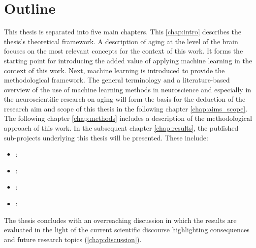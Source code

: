 \section{Outline}
This thesis is separated into five main chapters. This \autoref{chap:intro} describes the thesis's theoretical framework. A description of aging at the level of the brain focuses on the most relevant concepts for the context of this work. It forms the starting point for introducing the added value of applying machine learning in the context of this work. Next, machine learning is introduced to provide the methodological framework. The general terminology and a literature-based overview of the use of machine learning methods in neuroscience and especially in the neuroscientific research on aging will form the basis for the deduction of the research aim and scope of this thesis in the following chapter \autoref{chap:aims_scope}. The following chapter \autoref{chap:methods} includes a description of the methodological approach of this work. In the subsequent chapter \autoref{chap:results}, the published sub-projects underlying this thesis will be presented. These include:
\begin{itemize}
\item {}:\\ 
\item {}:\\ 
\item {}:\\ 
\item {}:\\ 
\end{itemize}
\noindent The thesis concludes with an overreaching discussion in which the results are evaluated in the light of the current scientific discourse highlighting consequences and future research topics (\autoref{chap:discussion}). 

































